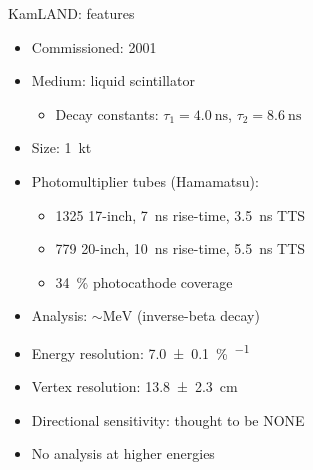 \documentclass[14pt]{beamer}
\begin{document}
\begin{frame}[t]{KamLAND: features}
	\begin{itemize}
		\item Commissioned: \num{2001}
		\item Medium: liquid scintillator
			\begin{itemize}
				\item Decay constants: $\tau_1 = \SI{4.0}{\nano\second}$, $\tau_2 = \SI{8.6}{\nano\second}$
			\end{itemize}
		\item Size: \SI{1}{\kilo\tonne}
		\item Photomultiplier tubes (Hamamatsu):\\
			\begin{itemize}
				\item \num{1325} 17-inch, \SI{7}{\nano\second} rise-time,
					\SI{3.5}{\nano\second} TTS
				\item \num{779} 20-inch, \SI{10}{\nano\second} rise-time,
					\SI{5.5}{\nano\second} TTS
				\item \SI{34}{\percent} photocathode coverage
			\end{itemize}
		\item Analysis: $\sim\!\si{\mega\electronvolt}$ \APnue
			(inverse-beta decay)
		\item Energy resolution:
			\SI{7.0\pm0.1}{\percent\per{}}
		\item Vertex resolution:
			\SI{13.8\pm2.3}{\centi\meter}
		\item {\color{red}Directional sensitivity: thought to be NONE}
		\item {\color{red}No analysis at higher energies}
	\end{itemize}
\end{frame}
\end{document}

